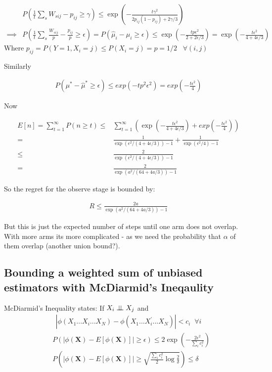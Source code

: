 \documentclass{article}
\newcommand{\eqn}[1]{\begin{align}#1\end{align}}
\theoremstyle{plain}
\theoremstyle{definition}
\begin{document}
\eqn {
& P(\frac{1}{t}\sum_s W_{sij} - p_{ij} \geq \gamma) \leq \exp(-\frac{t\gamma^2}{2p_{ij}(1-p_{ij})+2\gamma/3}) \\
\implies & P(\frac{1}{t}\sum_s \frac{W_{sij}}{p} - \frac{p_{ij}}{p} \geq \epsilon) = P(\hat{\mu}_i - \mu_i \geq \epsilon) \leq \exp(-\frac{tp\epsilon^2}{2+2\epsilon/3}) = \exp(-\frac{t\epsilon^2}{4+4\epsilon/3})
}
Where $p_{ij} = P(Y = 1, X_i = j) \leq P(X_i=j) = p = 1/2 \;\;\; \forall(i,j)$

Similarly 

\eqn {
P(\mu^* - \hat{\mu}^* \geq \epsilon) \leq exp(-tp^2\epsilon^2) = exp(-\frac{t\epsilon^2}{4})
}

Now 

\eqn {
E[n] = \sum_{t=1}^\infty P(n \geq t) \leq & \sum_{t=1}^\infty \left( \exp(-\frac{t\epsilon^2}{4+4\epsilon/3}) +exp(-\frac{t\epsilon^2}{4}) \right) \\
= & \frac{1}{\exp(\epsilon^2/(4+4\epsilon/3)) - 1} + \frac{1}{\exp(\epsilon^2/4) - 1} \\
\leq & \frac{2}{\exp(\epsilon^2/(4+4\epsilon/3)) - 1} \\
= & \frac{2}{\exp(a^2/(64+4a/3)) - 1}
}

So the regret for the observe stage is bounded by:

\eqn {
R \leq \frac{2a}{\exp(a^2/(64+4a/3)) - 1}
}





But this is just the expected number of steps until one arm does not overlap. With more arms its more complicated - as we need the probability that $\alpha$ of them overlap (another union bound?).






\subsection{Bounding a weighted sum of unbiased estimators with McDiarmid's Ineqaulity}

McDiarmid's Inequality states:
If $X_i \perp\!\!\!\perp X_j$ and 
\eqn{
|\phi(X_1...X_i...X_N) - \phi(X_1...X_i^{'}...X_N)| < c_i \;\; \forall i
}
\eqn{
& P\left(|\phi(\boldsymbol{X}) - E[\phi(\boldsymbol{X})]| \geq \epsilon \right) \leq 2 \exp \left(-\frac{2 \epsilon^2}{\sum_{i}c_i^2} \right)\\
\label{eqn:McDiarmid}
& P\left(|\phi(\boldsymbol{X}) - E[\phi(\boldsymbol{X})]| \geq 
\sqrt{\frac{\sum_{i}c_i^2}{2}\log{\frac{2}{\delta}}} 
\right) \leq \delta
}
\end{document}
